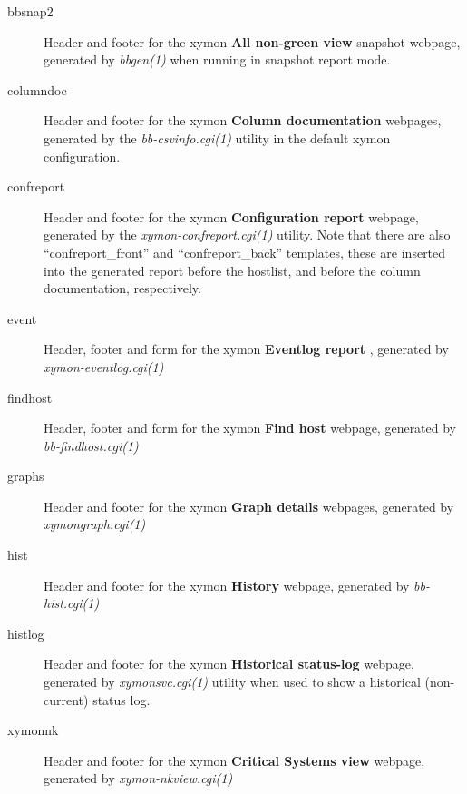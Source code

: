 \begin{description}
 

\item[bbsnap2] Header and footer for the xymon \textbf{All non-green view}
 snapshot webpage, generated by \emph{bbgen(1)}
 when running in snapshot report mode. 

 

\item[columndoc] Header and footer for the xymon \textbf{Column documentation}
 webpages, generated by the \emph{bb-csvinfo.cgi(1)}
 utility in the default xymon configuration. 

 

\item[confreport] Header and footer for the xymon \textbf{Configuration report}
 webpage, generated by the \emph{xymon-confreport.cgi(1)}
 utility. Note that there are also ``confreport\_front'' and ``confreport\_back'' templates, these are inserted into the generated report before the hostlist, and before the column documentation, respectively. 

 

\item[event] Header, footer and form for the xymon \textbf{Eventlog report}
, generated by \emph{xymon-eventlog.cgi(1)}


 

\item[findhost] Header, footer and form for the xymon \textbf{Find host}
 webpage, generated by \emph{bb-findhost.cgi(1)}


 

\item[graphs] Header and footer for the xymon \textbf{Graph details}
 webpages, generated by \emph{xymongraph.cgi(1)}


 

\item[hist] Header and footer for the xymon \textbf{History}
 webpage, generated by \emph{bb-hist.cgi(1)}


 

\item[histlog] Header and footer for the xymon \textbf{Historical status-log}
 webpage, generated by \emph{xymonsvc.cgi(1)}
 utility when used to show a historical (non-current) status log. 

 

\item[xymonnk] Header and footer for the xymon \textbf{Critical Systems view}
 webpage, generated by \emph{xymon-nkview.cgi(1)}



\end{description}
